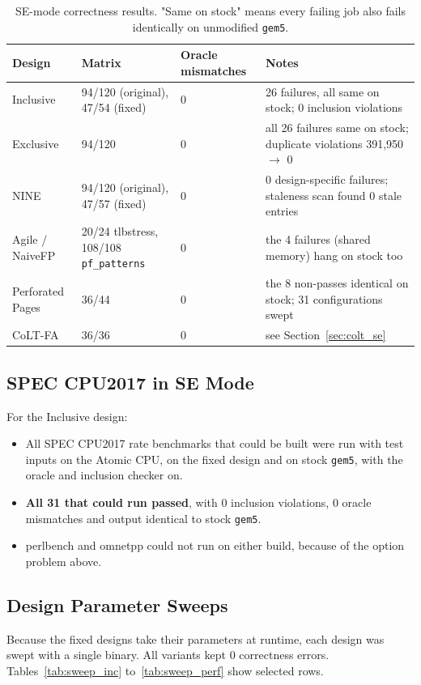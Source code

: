 \begin{table}[htbp]
\centering
\small
\caption{SE-mode correctness results. "Same on stock" means every failing job also fails identically on unmodified \texttt{gem5}.}
\label{tab:se_matrix}
\begin{tabularx}{\textwidth}{l l l X}
\toprule
\textbf{Design} & \textbf{Matrix} & \textbf{Oracle mismatches} & \textbf{Notes} \\
\midrule
Inclusive & 94/120 (original), 47/54 (fixed) & 0 & 26 failures, all same on stock; 0 inclusion violations \\
Exclusive & 94/120 & 0 & all 26 failures same on stock; duplicate violations 391,950 $\rightarrow$ 0 \\
NINE & 94/120 (original), 47/57 (fixed) & 0 & 0 design-specific failures; staleness scan found 0 stale entries \\
Agile / NaiveFP & 20/24 tlbstress, 108/108 \texttt{pf\_patterns} & 0 & the 4 failures (shared memory) hang on stock too \\
Perforated Pages & 36/44 & 0 & the 8 non-passes identical on stock; 31 configurations swept \\
CoLT-FA & 36/36 & 0 & see Section~\ref{sec:colt_se} \\
\bottomrule
\end{tabularx}
\end{table}

\subsection{SPEC CPU2017 in SE Mode}
For the Inclusive design:
\begin{itemize}
    \item All SPEC CPU2017 rate benchmarks that could be built were run with test inputs on the Atomic CPU, on the fixed design and on stock \texttt{gem5}, with the oracle and inclusion checker on.
    \item \textbf{All 31 that could run passed}, with 0 inclusion violations, 0 oracle mismatches and output identical to stock \texttt{gem5}.
    \item perlbench and omnetpp could not run on either build, because of the option problem above.
\end{itemize}

\subsection{Design Parameter Sweeps}
Because the fixed designs take their parameters at runtime, each design was swept with a single binary. All variants kept 0 correctness errors. Tables~\ref{tab:sweep_inc} to~\ref{tab:sweep_perf} show selected rows.

